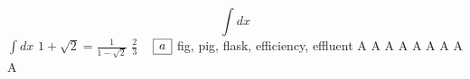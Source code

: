 \documentclass{article}
\begin{document}
\begin{equation}
  \int dx 
\end{equation}
\newpage
$\int dx$
\newpage
$1+\sqrt2=\frac1{1-\sqrt2}$
\newpage
$\frac23$
\newpage
\ 
\newpage
\( \begin{array}{|r|} \hline a \cr \hline \end{array} \)
\newpage
fig, pig, flask, efficiency, effluent
\newpage
\Huge A \LARGE A \Large A \large A \normalsize A \small A
\footnotesize A \scriptsize A \tiny A
\end{document}
